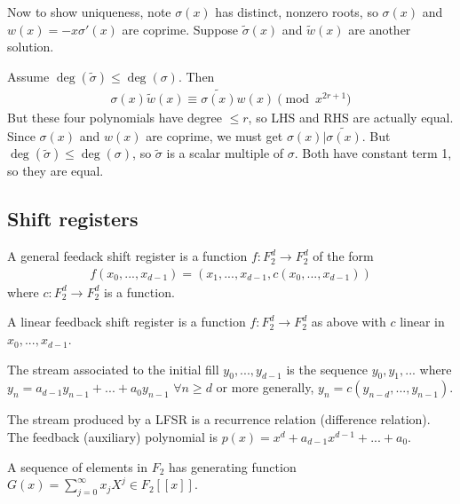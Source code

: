 \documentclass[a4paper]{article}
\begin{document}
Now to show uniqueness, note $\sigma(x)$ has distinct, nonzero roots, so $\sigma(x)$ and $w(x) = -x\sigma'(x)$ are coprime. Suppose $\tilde{\sigma}(x)$ and $\tilde{w}(x)$ are another solution.

Assume $\deg(\tilde{\sigma}) \leq \deg(\sigma)$. Then
\begin{equation*}
\begin{aligned}
\sigma(x) \tilde{w}(x) \equiv \tilde{\sigma(x)} w(x) \pmod {x^{2r+1}}
\end{aligned}
\end{equation*}
But these four polynomials have degree $\leq r$, so LHS and RHS are actually equal. Since $\sigma(x)$ and $w(x)$ are coprime, we must get $\sigma(x) | \tilde{\sigma(x)}$. But $\deg(\tilde{\sigma}) \leq \deg(\sigma)$, so $\tilde{\sigma}$ is a scalar multiple of $\sigma$. Both have constant term 1, so they are equal.

\subsection{Shift registers}
\begin{defi}
A general feedack shift register is a function $f:F_2^d \to F_2^d$ of the form
\begin{equation*}
\begin{aligned}
f(x_0,...,x_{d-1}) = (x_1,...,x_{d-1},c(x_0,...,x_{d-1}))
\end{aligned}
\end{equation*}
where $c:F_2^d \to F_2^d$ is a function.
\end{defi}

\begin{defi}
A linear feedback shift register is a function $f:F_2^d \to F_2^d$ as above with $c$ linear in $x_0,...,x_{d-1}$.
\end{defi}

The stream associated to the initial fill $y_0,...,y_{d-1}$ is the sequence $y_0,y_1,...$ where $y_n = a_{d-1} y_{n-1} + ... + a_0 y_{n-1}$ $\forall n \geq d$ or more generally, $y_n = c(y_{n-d},...,y_{n-1})$.

The stream produced by a LFSR is a recurrence relation (difference relation). The feedback (auxiliary) polynomial is $p(x) = x^d+a_{d-1} x^{d-1} + ... + a_0$.

\begin{defi}
A sequence of elements in $F_2$ has generating function $G(x) = \sum_{j=0}^\infty x_j X^j \in F_2[[x]]$.
\end{defi}
\end{document}
